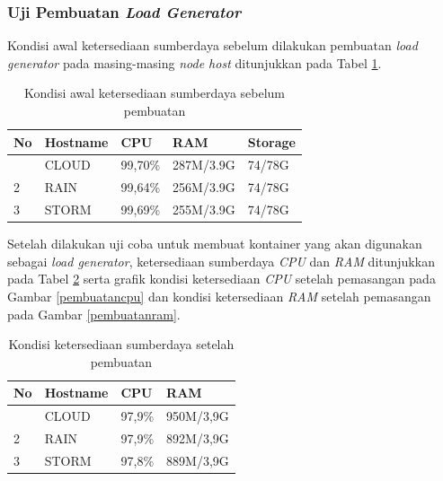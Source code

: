 			\subsubsection{Uji Pembuatan \textit{Load Generator}}
				Kondisi awal ketersediaan sumberdaya sebelum dilakukan pembuatan \textit{load generator} pada masing-masing \textit{node host} ditunjukkan pada Tabel \ref{suberdayaawalpembuatan}.
				\begin{longtable}{|p{}|p{}|p{}|p{}|p{}|}
					\caption{Kondisi awal ketersediaan sumberdaya sebelum pembuatan} \label{suberdayaawalpembuatan} \\
					\hline
					\textbf{No} & \textbf{Hostname} & \textbf{CPU} & \textbf{RAM} & \textbf{Storage} \\ \hline
					\endhead
					\endfoot
					\endlastfoot
					1 & CLOUD & 99,70\% & 287M/3.9G & 74/78G \\ \hline
					2 & RAIN & 99,64\% & 256M/3.9G & 74/78G \\ \hline
					3 & STORM & 99,69\% & 255M/3.9G & 74/78G \\ \hline
				\end{longtable}
			
				Setelah dilakukan uji coba untuk membuat kontainer yang akan digunakan sebagai \textit{load generator}, 
				ketersediaan sumberdaya \textit{CPU} dan \textit{RAM} ditunjukkan pada Tabel \ref{suberdayasetpembuatan} serta grafik  kondisi ketersediaan \textit{CPU} setelah pemasangan pada Gambar \ref{pembuatancpu} dan kondisi ketersediaan \textit{RAM} setelah pemasangan pada Gambar \ref{pembuatanram}.
				\begin{longtable}{|p{}|p{}|p{}|p{}|}
					\caption{Kondisi ketersediaan sumberdaya setelah pembuatan} \label{suberdayasetpembuatan} \\
					\hline
					\textbf{No} & \textbf{Hostname} & \textbf{CPU} & \textbf{RAM} \\ \hline
					\endhead
					\endfoot
					\endlastfoot
					1 & CLOUD & 97,9\% & 950M/3,9G \\ \hline
					2 & RAIN & 97,9\% & 892M/3,9G \\ \hline
					3 & STORM & 97,8\% & 889M/3,9G \\ \hline
				\end{longtable}
				
